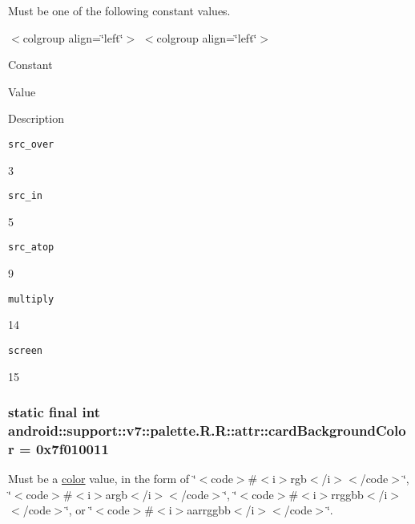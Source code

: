 Must be one of the following constant values. \begin{TabularC}{0}
\hline
\end{TabularC}
$<$colgroup align=\char`\"{}left\char`\"{}$>$ $<$colgroup align=\char`\"{}left\char`\"{}$>$ 

Constant

Value

Description 

{\tt src\_\-over}

3

{\tt src\_\-in}

5

{\tt src\_\-atop}

9

{\tt multiply}

14

{\tt screen}

15\hypertarget{classandroid_1_1support_1_1v7_1_1palette_1_1_r_1_1attr_7e05ece7de3e098481a50f4a25fab67a}{
\subsubsection[{cardBackgroundColor}]{\setlength{\rightskip}{0pt plus 5cm}static final int android::support::v7::palette.R.R::attr::cardBackgroundColor = 0x7f010011}}
\label{classandroid_1_1support_1_1v7_1_1palette_1_1_r_1_1attr_7e05ece7de3e098481a50f4a25fab67a}


Must be a \hyperlink{classandroid_1_1support_1_1v7_1_1palette_1_1_r_1_1color}{color} value, in the form of \char`\"{}$<$code$>$\#$<$i$>$rgb$<$/i$>$$<$/code$>$\char`\"{}, \char`\"{}$<$code$>$\#$<$i$>$argb$<$/i$>$$<$/code$>$\char`\"{}, \char`\"{}$<$code$>$\#$<$i$>$rrggbb$<$/i$>$$<$/code$>$\char`\"{}, or \char`\"{}$<$code$>$\#$<$i$>$aarrggbb$<$/i$>$$<$/code$>$\char`\"{}. 

